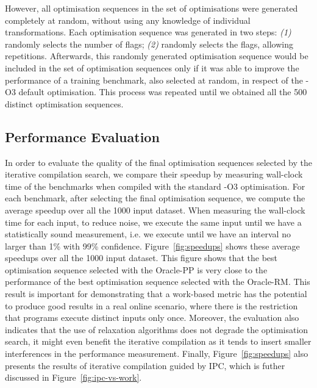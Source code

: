 \documentclass[sigplan,10pt]{acmart}
\theoremstyle{definition}
\newcommand{\itercomp}{{iterative compilation}}
\newcommand{\flagstype}{\usefont{T1}{cmr}{m}{n}}
\begin{document}
However, all optimisation sequences in the set of optimisations were generated completely at random, without using any knowledge of individual transformations.
Each optimisation sequence was generated in two steps: \textit{(1)} randomly selects the number of flags; \textit{(2)} randomly selects the flags, allowing repetitions.
Afterwards, this randomly generated optimisation sequence would be included in the set of optimisation sequences only if it was able to improve the performance of a training benchmark, also selected at random, in respect of the {\flagstype -O3} default optimisation.
This process was repeated until we obtained all the 500 distinct optimisation sequences.

\subsection{Performance Evaluation}

In order to evaluate the quality of the final optimisation sequences selected by the {\itercomp} search, we compare their speedup by measuring wall-clock time of the benchmarks when compiled with the standard {\flagstype -O3} optimisation.
For each benchmark, after selecting the final optimisation sequence, we compute the average speedup over all the 1000 input dataset.
When measuring the wall-clock time for each input, to reduce noise, we execute the same input until we have a statistically sound measurement, i.e. we execute until we have an interval no larger than 1\% with 99\% confidence.
Figure~\ref{fig:speedups} shows these average speedups over all the 1000 input dataset.
This figure shows that the best optimisation sequence selected with the Oracle-PP is very close to the performance of the best optimisation sequence selected with the Oracle-RM.
This result is important for demonstrating that a work-based metric has the potential to produce good results in a real online scenario, where there is the restriction that programs execute distinct inputs only once.
Moreover, the evaluation also indicates that the use of relaxation algorithms does not degrade the optimisation search,
it might even benefit the {\itercomp} as it tends to insert smaller interferences in the performance measurement.
Finally, Figure~\ref{fig:speedups} also presents the results of {\itercomp} guided by IPC, which is futher discussed in Figure~\ref{fig:ipc-vs-work}.
\end{document}
